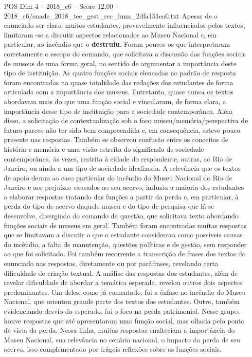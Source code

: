 \begin{textsample}{POS Dim 4 – 2018\_c6 – Score 12.00 – 2018\_c6/enade\_2018\_tec\_gest\_rec\_hum\_2dfa151ea0.txt}
Apesar de o enunciado ser claro, muitos estudantes, provavelmente influenciados pelos textos, limitaram -se a discutir aspectos relacionados ao Museu Nacional e, em particular, ao incêndio que o \textbf{destruiu}.
Foram poucos os que interpretaram corretamente o escopo do comando, que solicitava a discussão das funções sociais de museus de uma forma geral, no sentido de argumentar a importância deste tipo de instituição.
As quatro funções sociais elencadas no padrão de resposta foram encontradas na quase totalidade das redações dos estudantes de forma articulada com a importância dos museus.
Entretanto, quase nunca os textos abordavam mais do que uma função social e vinculavam, de forma clara, a importância desse tipo de instituição para a sociedade contemporânea.
Além disso, a solicitação de contextualização sob o foco museu/memória/perspectiva de futuro parece não ter sido bem compreendida e, em consequência, esteve pouco presente nas respostas.
Também se observou confusão entre os conceitos de história e memória e uma visão estreita do significado de sociedade contemporânea, às vezes, restrita à cidade do respondente, outras, ao Rio de Janeiro, ou ainda a um tipo de sociedade idealizada.
A relevância que os textos de apoio deram ao caso particular do incêndio do Museu Nacional do Rio de Janeiro e aos prejuízos causados ao seu acervo, induziu a maioria dos estudantes a elaborar respostas tratando das funções a partir da perda e, em particular, à perda do tipo de acervo daquele museu e do tipo de pesquisa que lá se desenvolve, divergindo do comando da questão, que solicitava texto abordando funções sociais de museus em geral.
Também foram encontradas muitas respostas que se limitavam a discutir o que o estudante considerava como possíveis causas do incêndio, a falta de manutenção, questões políticas e de gestão, sem responder ao que foi solicitado.
Foi também recorrente a transcrição de frases dos textos do enunciado nas respostas, diretamente ou por paráfrases, revelando certa dificuldade de criação textual.
A análise das respostas dos estudantes, além de revelar dificuldade de abordar a temática esperada, revelou outros dois aspectos predominantes.
Um deles, como já comentado, foi a ênfase no incêndio do Museu Nacional, que orientou grande parte dos textos dos estudantes.
Outro, também evidenciando desvio do esperado, foi o foco na perda patrimonial.
Nesse grupo, houve respostas que até apresentaram uma função social, mas olhada pelo ponto de vista da perda.
Nessa linha, muitas respostas enalteciam a importância do Museu Nacional, sua relevância no cenário nacional, o impacto da perda de seu acervo, isso complementado por frágeis reflexões sobre as funções sociais.

\end{textsample}
